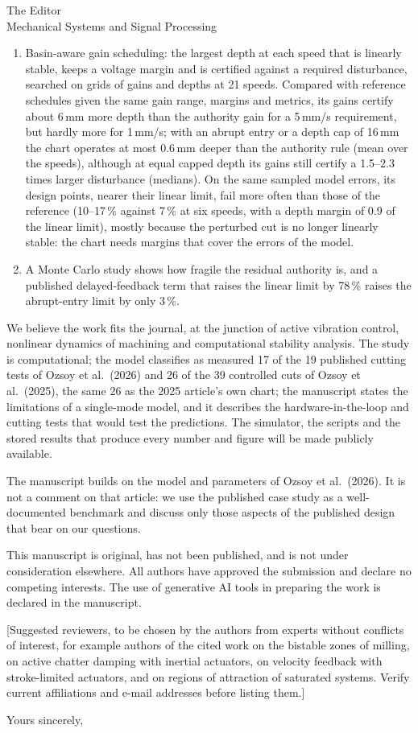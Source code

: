 \documentclass[11pt]{letter}
\begin{document}
\begin{letter}{The Editor\\ Mechanical Systems and Signal Processing}
\begin{enumerate}
\item Basin-aware gain scheduling: the largest depth at each speed that is linearly stable, keeps a voltage margin and is certified against a required disturbance, searched on grids of gains and depths at 21 speeds. Compared with reference schedules given the same gain range, margins and metrics, its gains certify about 6\,mm more depth than the authority gain for a 5\,mm/s requirement, but hardly more for 1\,mm/s; with an abrupt entry or a depth cap of 16\,mm the chart operates at most 0.6\,mm deeper than the authority rule (mean over the speeds), although at equal capped depth its gains still certify a 1.5--2.3 times larger disturbance (medians). On the same sampled model errors, its design points, nearer their linear limit, fail more often than those of the reference (10--17\,\% against 7\,\% at six speeds, with a depth margin of 0.9 of the linear limit), mostly because the perturbed cut is no longer linearly stable: the chart needs margins that cover the errors of the model.
\item A Monte Carlo study shows how fragile the residual authority is, and a published delayed-feedback term that raises the linear limit by 78\,\% raises the abrupt-entry limit by only 3\,\%.
\end{enumerate}

We believe the work fits the journal, at the junction of active vibration control, nonlinear dynamics of machining and computational stability analysis. The study is computational; the model classifies as measured 17 of the 19 published cutting tests of Ozsoy et al.\ (2026) and 26 of the 39 controlled cuts of Ozsoy et al.\ (2025), the same 26 as the 2025 article's own chart; the manuscript states the limitations of a single-mode model, and it describes the hardware-in-the-loop and cutting tests that would test the predictions. The simulator, the scripts and the stored results that produce every number and figure will be made publicly available.

The manuscript builds on the model and parameters of Ozsoy et al.\ (2026). It is not a comment on that article: we use the published case study as a well-documented benchmark and discuss only those aspects of the published design that bear on our questions.

This manuscript is original, has not been published, and is not under consideration elsewhere. All authors have approved the submission and declare no competing interests. The use of generative AI tools in preparing the work is declared in the manuscript.

[Suggested reviewers, to be chosen by the authors from experts without conflicts of interest, for example authors of the cited work on the bistable zones of milling, on active chatter damping with inertial actuators, on velocity feedback with stroke-limited actuators, and on regions of attraction of saturated systems. Verify current affiliations and e-mail addresses before listing them.]

\closing{Yours sincerely,}
\end{letter}
\end{document}
